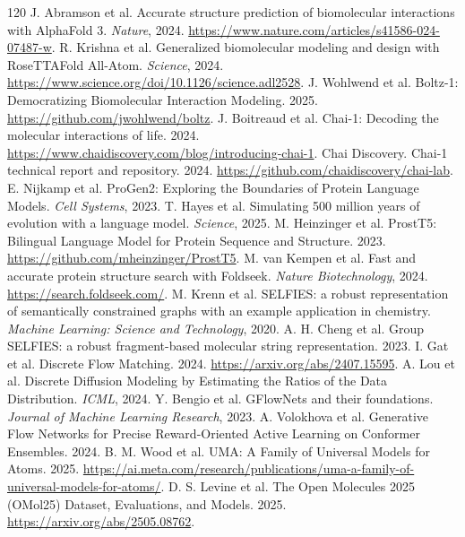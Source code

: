 \documentclass[11pt]{article}
\newcommand{\1}{\mathbf{1}}
\begin{document}
\begin{thebibliography}{120}
 J. Abramson et al. Accurate structure prediction of biomolecular interactions with AlphaFold 3. \emph{Nature}, 2024. \url{https://www.nature.com/articles/s41586-024-07487-w}.
 R. Krishna et al. Generalized biomolecular modeling and design with RoseTTAFold All-Atom. \emph{Science}, 2024. \url{https://www.science.org/doi/10.1126/science.adl2528}.
 J. Wohlwend et al. Boltz-1: Democratizing Biomolecular Interaction Modeling. 2025. \url{https://github.com/jwohlwend/boltz}.
 J. Boitreaud et al. Chai-1: Decoding the molecular interactions of life. 2024. \url{https://www.chaidiscovery.com/blog/introducing-chai-1}.
 Chai Discovery. Chai-1 technical report and repository. 2024. \url{https://github.com/chaidiscovery/chai-lab}.
 E. Nijkamp et al. ProGen2: Exploring the Boundaries of Protein Language Models. \emph{Cell Systems}, 2023.
 T. Hayes et al. Simulating 500 million years of evolution with a language model. \emph{Science}, 2025.
 M. Heinzinger et al. ProstT5: Bilingual Language Model for Protein Sequence and Structure. 2023. \url{https://github.com/mheinzinger/ProstT5}.
 M. van Kempen et al. Fast and accurate protein structure search with Foldseek. \emph{Nature Biotechnology}, 2024. \url{https://search.foldseek.com/}.
 M. Krenn et al. SELFIES: a robust representation of semantically constrained graphs with an example application in chemistry. \emph{Machine Learning: Science and Technology}, 2020.
 A. H. Cheng et al. Group SELFIES: a robust fragment-based molecular string representation. 2023.
 I. Gat et al. Discrete Flow Matching. 2024. \url{https://arxiv.org/abs/2407.15595}.
 A. Lou et al. Discrete Diffusion Modeling by Estimating the Ratios of the Data Distribution. \emph{ICML}, 2024.
 Y. Bengio et al. GFlowNets and their foundations. \emph{Journal of Machine Learning Research}, 2023.
 A. Volokhova et al. Generative Flow Networks for Precise Reward-Oriented Active Learning on Conformer Ensembles. 2024.
 B. M. Wood et al. UMA: A Family of Universal Models for Atoms. 2025. \url{https://ai.meta.com/research/publications/uma-a-family-of-universal-models-for-atoms/}.
 D. S. Levine et al. The Open Molecules 2025 (OMol25) Dataset, Evaluations, and Models. 2025. \url{https://arxiv.org/abs/2505.08762}.

\end{thebibliography}
\end{document}
